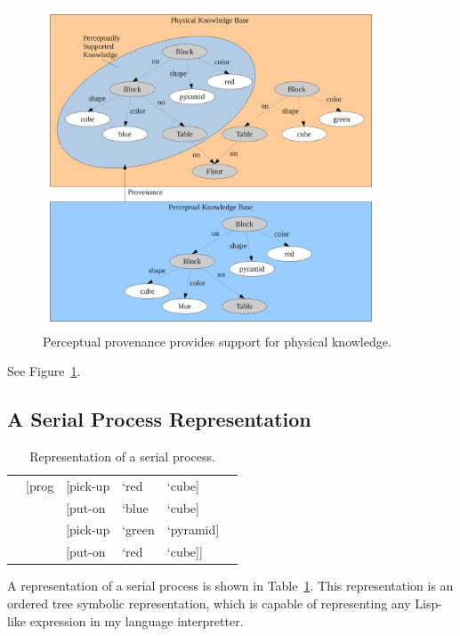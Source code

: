 \begin{figure}[bth]
  \center
  \includegraphics[width=10cm]{gfx/physical_perception}
  \caption[Perceptual provenance provides support for physical knowledge]{Perceptual provenance provides support for physical knowledge.}
  \label{fig:physical_perception}
\end{figure}

See Figure~\ref{fig:physical_perception}.


\subsection{A Serial Process Representation}
\label{sec:serial_process_representation}

\begin{table}
  \myfloatalign
  \begin{tabularx}{\textwidth}{XllllX}
    & [prog & [pick-up & `red   & `cube]    & \\
    &       & [put-on  & `blue  & `cube]    & \\
    &       & [pick-up & `green & `pyramid] & \\
    &       & [put-on  & `red   & `cube]]   & \\
  \end{tabularx}
  \caption[Representation of a serial process]{Representation of a serial process.}
  \label{tab:serial_process_representation}
\end{table}

A representation of a serial process is shown in
Table~\ref{tab:serial_process_representation}.  This representation is
an ordered tree symbolic representation, which is capable of
representing any Lisp-like expression in my language interpretter.


